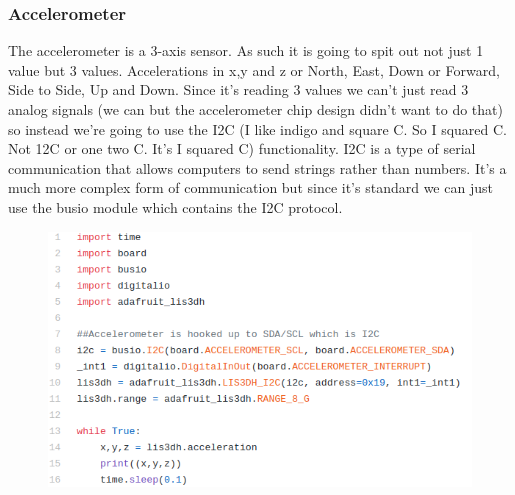 {\subsubsection{Accelerometer}
\label{s:modules}
The accelerometer is a 3-axis sensor. As such it is going to spit out not just 1 value but 3 values. Accelerations in x,y and z or North, East, Down or Forward, Side to Side, Up and Down. Since it’s reading 3 values we can’t just read 3 analog signals (we can but the accelerometer chip design didn’t want to do that) so instead we’re going to use the I2C (I like indigo and square C. So I squared C. Not 12C or one two C. It’s I squared C) functionality. I2C is a type of serial communication that allows computers to send strings rather than numbers. It’s a much more complex form of communication but since it’s standard we can just use the busio module which contains the I2C protocol.
\begin{figure}[H]
  \begin{center}
    \includegraphics[width=\textwidth]{Figures/accelerometer_code.png}
  \end{center}
\end{figure}
}
